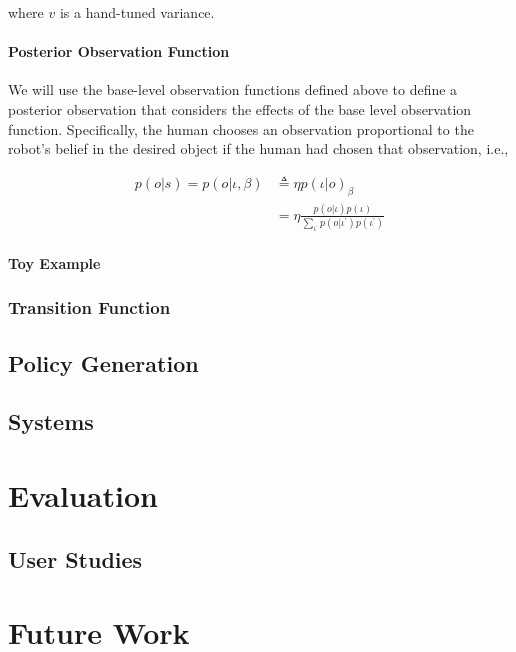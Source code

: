 \documentclass{article}
\begin{document}
where $v$ is a hand-tuned variance. 

\paragraph{Posterior Observation Function}

We will use the base-level observation functions defined above to define a posterior observation that considers the effects of the base level observation function. Specifically, the human chooses an observation proportional to the robot's belief in the desired object if the human had chosen that observation, i.e., 

\begin{align}
p(o|s) = p(o|\iota, \beta) &\triangleq \eta p(\iota|o)_\beta \\
&= \eta \frac{p(o|\iota) p(\iota)}{\sum_{\iota^\prime} p(o|\iota^\prime)p(\iota^\prime)} 
\end{align}



\paragraph{Toy Example}
\subsubsection{Transition Function}

\subsection{Policy Generation}

\subsection{Systems}


\section{Evaluation}

\subsection{User Studies}

\section{Future Work}
\end{document}
